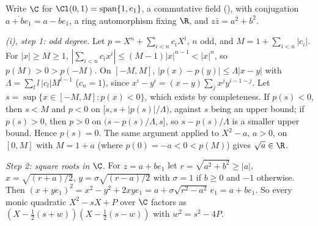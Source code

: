 Write $\C$ for $\Cl(0,1) = \mathrm{span}\{1, e_{1}\}$, a commutative field (), with conjugation $\overline{a + be_{1}} = a - be_{1}$, a ring automorphism fixing $\R$, and $z\bar{z} = a^{2} + b^{2}$.

\emph{(i), step 1: odd degree.} Let $p = X^{n} + \sum_{i < n}c_{i}X^{i}$, $n$ odd, and $M = 1 + \sum_{i < n}|c_{i}|$. For $|x| \ge M \ge 1$, $|\sum_{i<n}c_{i}x^{i}| \le (M - 1)|x|^{n-1} < |x|^{n}$, so $p(M) > 0 > p(-M)$. On $[-M, M]$, $|p(x) - p(y)| \le \Lambda|x - y|$ with $\Lambda = \sum_{l}l\,|c_{l}|M^{l-1}$ ($c_{n} = 1$), since $x^{i} - y^{i} = (x - y)\sum_{j}x^{j}y^{i-1-j}$. Let $s = \sup\{x \in [-M, M] : p(x) < 0\}$, which exists by completeness. If $p(s) < 0$, then $s < M$ and $p < 0$ on $[s, s + |p(s)|/\Lambda)$, against $s$ being an upper bound; if $p(s) > 0$, then $p > 0$ on $(s - p(s)/\Lambda, s]$, so $s - p(s)/\Lambda$ is a smaller upper bound. Hence $p(s) = 0$. The same argument applied to $X^{2} - a$, $a > 0$, on $[0, M]$ with $M = 1 + a$ (where $p(0) = -a < 0 < p(M)$) gives $\sqrt{a} \in \R$.

\emph{Step 2: square roots in $\C$.} For $z = a + be_{1}$ let $r = \sqrt{a^{2} + b^{2}} \ge |a|$, $x = \sqrt{(r + a)/2}$, $y = \sigma\sqrt{(r - a)/2}$ with $\sigma = 1$ if $b \ge 0$ and $-1$ otherwise. Then $(x + ye_{1})^{2} = x^{2} - y^{2} + 2xye_{1} = a + \sigma\sqrt{r^{2} - a^{2}}\,e_{1} = a + be_{1}$. So every monic quadratic $X^{2} - sX + P$ over $\C$ factors as $(X - \tfrac12(s + w))(X - \tfrac12(s - w))$ with $w^{2} = s^{2} - 4P$.

